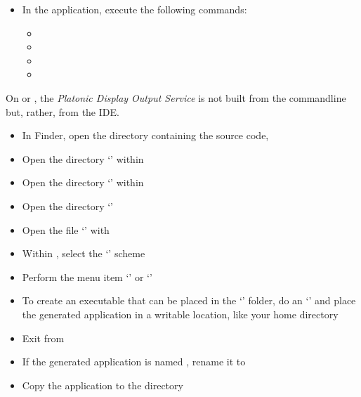 \tertiaryEnd
{}
\begin{itemize}
\item In the  application, execute the following commands:
\begin{itemize}
\item {}
\item\exSp{}
\item\exSp{}
\item\exSp{}
\end{itemize}
\end{itemize}
\tertiaryEnd
\secondaryEnd
{}
On \mac{} or \win, the \textit{Platonic Display Output Service} is not built from the
command\longDash{}line but, rather, from the IDE.
\begin{itemize}
\item In Finder, open the directory containing the \mplusm{} source code,
\item\exSp{}Open the directory `' within 
\item\exSp{}Open the directory `'
within 
\item\exSp{}Open the directory `'
\item\exSp{}Open the file `' with
\item\exSp{}Within , select the
`' scheme
\item\exSp{}Perform the menu item `' or
`'
\item\exSp{}To create an executable that can be placed in the `'
folder, do an `'
and place the generated application in a writable location, like your home directory
\item\exSp{}Exit from 
\item\exSp{}If the generated application is named
, rename it to\\
\item\exSp{}Copy the  application to the
 directory
\end{itemize}
